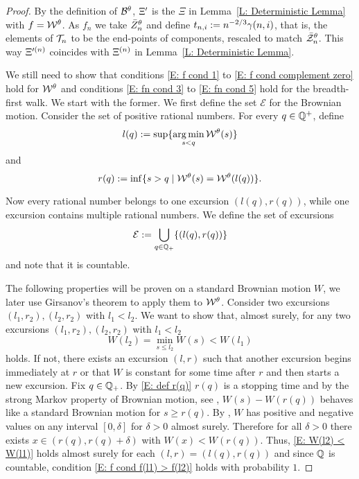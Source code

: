 \begin{proof}
	By the definition of $\mathcal{B}^{\theta}$, 
	$\Xi^{\prime}$ is the $\Xi$ in Lemma~\ref{L: Deterministic Lemma} with $f = \mathcal{W}^{\theta}$.
	As $f_n$ we take $\bar{Z}^{\theta}_n$ and define $t_{n, i} := n^{-2 / 3} \gamma(n,i)$, that is, 
	the elements of $\mathcal{T}_n$ to be the end-points of components,
	rescaled to match $\bar{\mathcal{Z}}^{\theta}_n$.
	This way $\Xi^{\prime (n)}$ coincides with $\Xi^{(n)}$ in Lemma~\ref{L: Deterministic Lemma}.
	
	We still need to show that conditions \eqref{E: f cond 1} to \eqref{E: f cond complement zero} hold for $\mathcal{W}^{\theta}$
	and conditions \eqref{E: fn cond 3} to \eqref{E: fn cond 5} hold for the breadth-first walk.
	We start with the former. 
	We first define the set $\mathcal{E}$ for the Brownian motion.
	Consider the set of positive rational numbers.
	For every $q \in \mathbb{Q}^+$, 
	define 
	\begin{equation} \label{E: def l(q)}
		l(q) := \sup\{ \operatorname*{arg\,min}_{s < q} \mathcal{W}^{\theta}(s) \}
	\end{equation}
	and
	\begin{equation} \label{E: def r(q)}
		r(q) := \inf\{ {s > q \; | \; \mathcal{W}^{\theta}(s) = \mathcal{W}^{\theta}(l(q))} \}.
	\end{equation}
	
	Now every rational number belongs to one excursion $(l(q), r(q))$,
	while one excursion contains multiple rational numbers.
	We define the set of excursions
	\begin{equation}
	\mathcal{E} := \bigcup_{q \in \mathbb{Q}_+} \{ (l(q), r(q)) \}
	\end{equation}
	and note that it is countable.
	
	The following properties will be proven on a standard Brownian motion $W$,
	we later use Girsanov's theorem to apply them to $\mathcal{W}^{\theta}$.
	Consider two excursions $(l_1, r_2), (l_2, r_2)$ with $l_1 < l_2$.
	We want to show that, almost surely, for any two excursions $(l_1, r_2), (l_2, r_2)$ with $l_1 < l_2$
	\begin{equation} \label{E: W(l2) < W(l1)}
		W(l_2) = \min_{s \leq l_2} W(s) < W(l_1)
	\end{equation} 
	holds.
	If not, there exists an excursion $(l,r)$ such that another excursion begins immediately at $r$
	or that $W$ is constant for some time after $r$ and then starts a new excursion.
	Fix $q \in \mathbb{Q}_+$. 
	By \eqref{E: def r(q)} $r(q)$ is a stopping time and by the strong Markov property of Brownian motion,
	see \cite[Theorem 2.16, p.43]{Morters.2010},
	$W(s) - W(r(q))$ behaves like a standard Brownian motion for $s \geq r(q)$.
	By \cite[Theorem 2.8, p.38]{Morters.2010},
	$W$ has positive and negative values on any interval $[0,\delta]$ for $\delta > 0$ almost surely.
	Therefore for all $\delta > 0$ there exists $x \in (r(q), r(q) + \delta)$ with $W(x) < W(r(q))$.
	Thus, \eqref{E: W(l2) < W(l1)} holds almost surely for each $(l,r) = (l(q), r(q))$ and since $\mathbb{Q}$ is countable,
	condition \eqref{E: f cond f(l1) > f(l2)} holds with probability $1$.
	

\end{proof}
